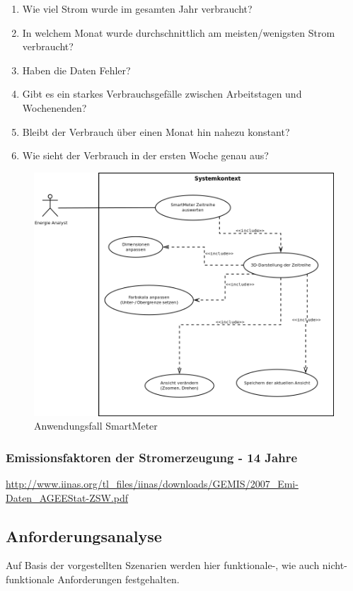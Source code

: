 \documentclass[12pt]{article}
\begin{document}
			\begin{enumerate}
			  \item Wie viel Strom wurde im gesamten Jahr verbraucht?
			  \item In welchem Monat wurde durchschnittlich am meisten/wenigsten Strom
			  verbraucht?
			  \item Haben die Daten Fehler?
			  \item Gibt es ein starkes Verbrauchsgefälle zwischen Arbeitstagen und
			  Wochenenden?
			  \item Bleibt der Verbrauch über einen Monat hin nahezu konstant?
			  \item Wie sieht der Verbrauch in der ersten Woche genau aus?
			\end{enumerate}
			
			
			\begin{figure}[hb]
					\includegraphics[width=1.0\textwidth]{dia/usecase-smartmeter.png}
					\caption[smartmeter]{Anwendungsfall SmartMeter}
			\end{figure}
			
		\subsubsection{Emissionsfaktoren der Stromerzeugung - 14 Jahre}
		
			\url{http://www.iinas.org/tl_files/iinas/downloads/GEMIS/2007_Emi-Daten_AGEEStat-ZSW.pdf}
	\subsection{Anforderungsanalyse}
		Auf Basis der vorgestellten Szenarien werden hier funktionale-, wie auch
		nicht-funktionale Anforderungen festgehalten.
\end{document}
